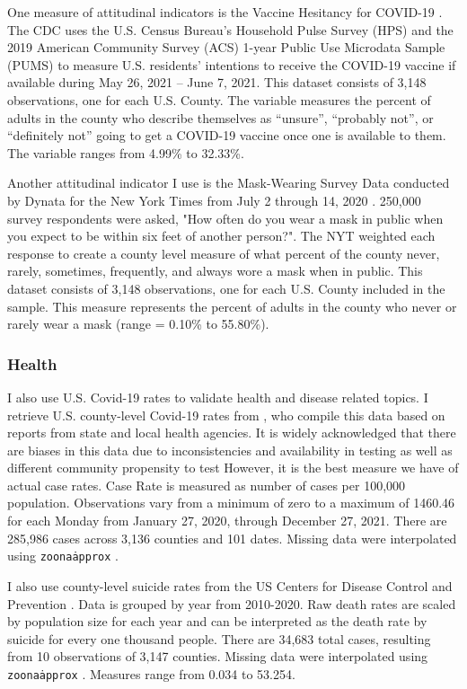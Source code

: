 One measure of attitudinal indicators is the Vaccine Hesitancy for COVID-19
\citep{vaches_data}. The CDC uses the U.S. Census Bureau’s Household Pulse Survey
(HPS) and the 2019 American Community Survey (ACS) 1-year Public Use Microdata
Sample (PUMS) to measure U.S. residents’ intentions to receive the COVID-19
vaccine if available during May 26, 2021 – June 7, 2021. This dataset consists
of 3,148 observations, one for each U.S. County. The variable
measures the percent of adults in the county who describe themselves as
“unsure”, “probably not”, or “definitely not” going to get a COVID-19 vaccine
once one is available to them. The variable ranges from 4.99\% to 32.33\%. 

Another attitudinal indicator I use is the Mask-Wearing Survey Data conducted by
Dynata for the New York Times from July 2 through 14, 2020 \citep{mask_data}. 250,000
survey respondents were asked, "How often do you wear a mask in public when you
expect to be within six feet of another person?". The NYT weighted each response
to create a county level measure of what percent of the county never, rarely,
sometimes, frequently, and always wore a mask when in public. This dataset
consists of 3,148 observations, one for each U.S. County included in the sample. This measure
represents the percent of adults in the county who never or rarely wear a mask
(range = 0.10\% to 55.80\%).

\subsubsection{Health}

I also use U.S. Covid-19 rates to validate health and disease related topics. I
retrieve U.S. county-level Covid-19 rates from \citet{covid_data}, who compile this
data based on reports from state and local health agencies. It is widely
acknowledged that there are biases in this data due to inconsistencies and
availability in testing as well as different community propensity to test
\citep{gu22, cdc20a} However, it is the best measure we have of actual case rates.
Case Rate is measured as number of cases per 100,000 population. Observations
vary from a minimum of zero to a maximum of 1460.46 for each Monday from January 27, 2020, through
December 27, 2021. There are 285,986 cases across 3,136 counties and 101
dates. Missing data were interpolated using \texttt{zoo\:\:na\.approx\(\)} \citep{zoo}.

I also use county-level suicide rates from the US Centers for Disease Control
and Prevention \citeyearpar{suic_data}. Data is grouped by year from 2010-2020. Raw death
rates are scaled by population size for each year and can be interpreted as the
death rate by suicide for every one thousand people. There are 34,683 total
cases, resulting from 10 observations of 3,147 counties. Missing data were interpolated using
\texttt{zoo\:\:na\.approx\(\)} \citep{zoo}. Measures range from 0.034 to 53.254.


